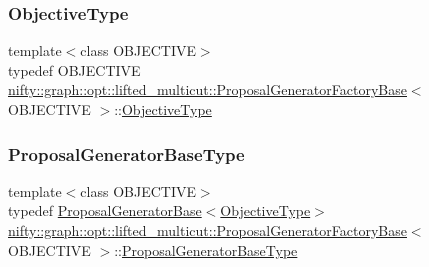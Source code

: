 \subsubsection{\texorpdfstring{Objective\+Type}{ObjectiveType}}
{\footnotesize\ttfamily template$<$class O\+B\+J\+E\+C\+T\+I\+VE$>$ \\
typedef O\+B\+J\+E\+C\+T\+I\+VE \hyperlink{classnifty_1_1graph_1_1opt_1_1lifted__multicut_1_1ProposalGeneratorFactoryBase}{nifty\+::graph\+::opt\+::lifted\+\_\+multicut\+::\+Proposal\+Generator\+Factory\+Base}$<$ O\+B\+J\+E\+C\+T\+I\+VE $>$\+::\hyperlink{classnifty_1_1graph_1_1opt_1_1lifted__multicut_1_1ProposalGeneratorFactoryBase_a1986f0a3868e76ba5613f49ca4fc7dc6}{Objective\+Type}}

\mbox{\label{classnifty_1_1graph_1_1opt_1_1lifted__multicut_1_1ProposalGeneratorFactoryBase_ab201fe6397370621b50977e67ae55ace}} 
\subsubsection{\texorpdfstring{Proposal\+Generator\+Base\+Type}{ProposalGeneratorBaseType}}
{\footnotesize\ttfamily template$<$class O\+B\+J\+E\+C\+T\+I\+VE$>$ \\
typedef \hyperlink{classnifty_1_1graph_1_1opt_1_1lifted__multicut_1_1ProposalGeneratorBase}{Proposal\+Generator\+Base}$<$\hyperlink{classnifty_1_1graph_1_1opt_1_1lifted__multicut_1_1ProposalGeneratorFactoryBase_a1986f0a3868e76ba5613f49ca4fc7dc6}{Objective\+Type}$>$ \hyperlink{classnifty_1_1graph_1_1opt_1_1lifted__multicut_1_1ProposalGeneratorFactoryBase}{nifty\+::graph\+::opt\+::lifted\+\_\+multicut\+::\+Proposal\+Generator\+Factory\+Base}$<$ O\+B\+J\+E\+C\+T\+I\+VE $>$\+::\hyperlink{classnifty_1_1graph_1_1opt_1_1lifted__multicut_1_1ProposalGeneratorFactoryBase_ab201fe6397370621b50977e67ae55ace}{Proposal\+Generator\+Base\+Type}}



